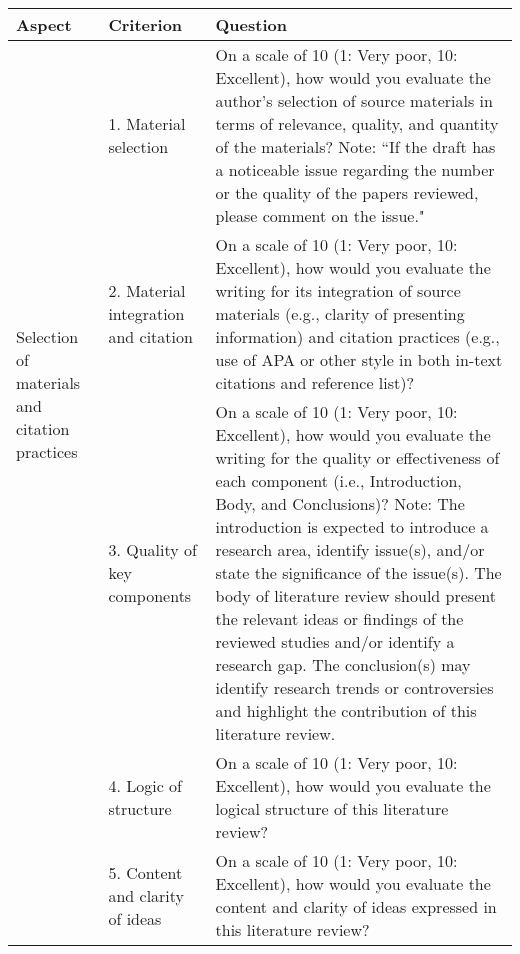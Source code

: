 \begin{table*}[]
    \centering
    \footnotesize
    \begin{tabular}{p{2.75cm}p{3.75cm}p{7.75cm}}
      \toprule
      Aspect & Criterion & Question \\ \midrule
         
    \multirow{3}{4em}{Selection of materials and citation practices}   & 1. Material selection & On a scale of 10 (1: Very poor, 10: Excellent), how would you evaluate the author’s selection of source materials in terms of relevance, quality, and quantity of the materials? Note: ``If the draft has a noticeable issue regarding the number or the quality of the papers reviewed, please comment on the issue." \\ \cmidrule{2-3}
         
          & 2. Material integration \newline and citation & On a scale of 10 (1: Very poor, 10: Excellent), how would you evaluate the writing for its integration of source materials (e.g., clarity of presenting information) and citation practices (e.g., use of APA or other style in both in-text citations and reference list)? \\ \midrule

     \multirow{3}{4em}{Overall structure}     & 3. Quality of key components & On a scale of 10 (1: Very poor, 10: Excellent), how would you evaluate the writing for the quality or effectiveness of each component (i.e., Introduction, Body, and Conclusions)? Note: The introduction is expected to introduce a research area, identify issue(s), and/or state the significance of the issue(s). The body of literature review should present the relevant ideas or findings of the reviewed studies and/or identify a research gap. The conclusion(s) may identify research trends or controversies and highlight the contribution of this literature review. \\ \cmidrule{2-3}
         
          & 4. Logic of structure & On a scale of 10 (1: Very poor, 10: Excellent), how would you evaluate the logical structure of this literature review? \\ \cmidrule{2-3}

          & 5. Content and clarity of ideas & On a scale of 10 (1: Very poor, 10: Excellent), how would you evaluate the content and clarity of ideas expressed in this literature review? \\ \midrule
         

\end{tabular}
\end{table*}
